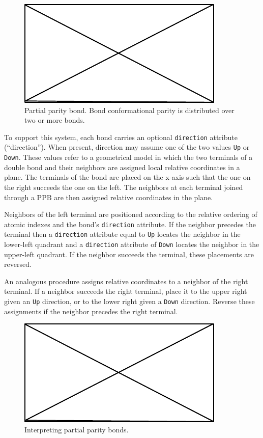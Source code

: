 \documentclass{article}
\def\ttt{\texttt}
\begin{document}
\begin{figure}
    \centering
    \includegraphics{filler}
    \caption{Partial parity bond. Bond conformational parity is distributed over two or more bonds.}
    \label{fig:partial-parity-bonds}
\end{figure}

To support this system, each bond carries an optional \ttt{direction} attribute (\enquote{direction}). When present, direction may assume one of the two values \ttt{Up} or \ttt{Down}. These values refer to a geometrical model in which the two terminals of a double bond and their neighbors are assigned local relative coordinates in a plane. The terminals of the bond are placed on the x-axis such that the one on the right succeeds the one on the left. The neighbors at each terminal joined through a PPB are then assigned relative coordinates in the plane.

Neighbors of the left terminal are positioned according to the relative ordering of atomic indexes and the bond's \ttt{direction} attribute. If the neighbor precedes the terminal then a \ttt{direction} attribute equal to \ttt{Up} locates the neighbor in the lower-left quadrant and a \ttt{direction} attribute of \ttt{Down} locates the neighbor in the upper-left quadrant. If the neighbor succeeds the terminal, these placements are reversed.

An analogous procedure assigns relative coordinates to a neighbor of the right terminal. If a neighbor succeeds the right terminal, place it to the upper right given an \ttt{Up} direction, or to the lower right given a \ttt{Down} direction. Reverse these assignments if the neighbor precedes the right terminal.

\begin{figure}
    \centering
    \includegraphics{filler}
    \caption{Interpreting partial parity bonds.}
    \label{fig:interpret-ppb}
\end{figure}
\end{document}
